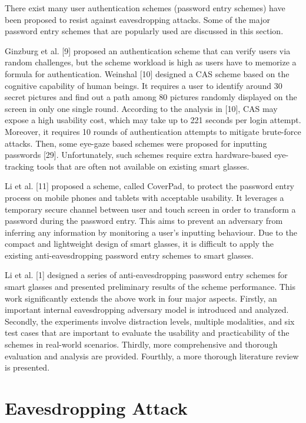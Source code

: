 \documentclass[12pt,a4paper,oneside]{report}
\begin{document}
There exist many user authentication schemes (password entry schemes)  have been proposed to resist against eavesdropping attacks. Some of the major password entry schemes that are popularly used are discussed in this section.
 \par 
 Ginzburg et al. [9] proposed an authentication scheme that
can verify users via random challenges, but the scheme
workload is high as users have to memorize a formula for
authentication.
  Weinshal [10] designed a CAS scheme based
on the cognitive capability of human beings. It requires a
user to identify around 30 secret pictures and find out a
path among 80 pictures randomly displayed on the screen
in only one single round. According to the analysis in [10],
CAS may expose a high usability cost, which may take
up to 221 seconds per login attempt. Moreover, it requires
10 rounds of authentication attempts to mitigate brute-force
attacks. Then, some eye-gaze based schemes were proposed
for inputting passwords [29]. Unfortunately, such schemes
require extra hardware-based eye-tracking tools that are often
not available on existing smart glasses.

\par Li et al. [11] proposed a scheme, called CoverPad, to protect
the password entry process on mobile phones and tablets
with acceptable usability. It leverages a temporary secure
channel between user and touch screen in order to transform
a password during the password entry. This aims to prevent
an adversary from inferring any information by monitoring
a user’s inputting behaviour. Due to the compact and lightweight design of smart glasses, it is difficult to apply the
existing anti-eavesdropping password entry schemes to smart
glasses.

\par Li et al. [1] designed a series of anti-eavesdropping
password entry schemes for smart glasses and presented
preliminary results of the scheme performance. This work
significantly extends the above work in four major aspects.
Firstly, an important internal eavesdropping adversary model
is introduced and analyzed. Secondly, the experiments involve
distraction levels, multiple modalities, and six test cases that
are important to evaluate the usability and practicability of the
schemes in real-world scenarios. Thirdly, more comprehensive
and thorough evaluation and analysis are provided. Fourthly,
a more thorough literature review is presented.

\section{Eavesdropping Attack}
\end{document}
